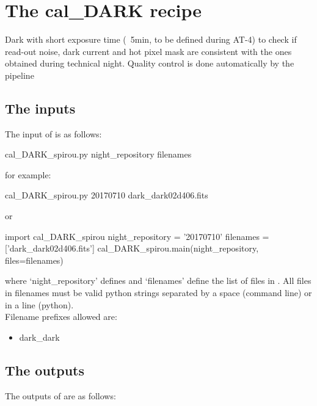 \section{The cal\_DARK recipe}
\label{ch:the_recipes:cal_DARK_spirou}

Dark with short exposure time (~5min, to be defined during AT-4) to check if read-out noise, dark current and hot pixel mask are consistent with the ones obtained during technical night. Quality control is done automatically by the pipeline \\


\subsection{The inputs}
The input of \calDARK is as follows:
\begin{cmdbox}
cal_DARK_spirou.py night_repository filenames
\end{cmdbox}
\noindent for example:
\begin{cmdbox}[title={example}]
cal_DARK_spirou.py 20170710 dark_dark02d406.fits
\end{cmdbox}
\noindent or
\begin{pythonbox}
import cal_DARK_spirou
night_repository = '20170710'
filenames = ['dark_dark02d406.fits']
cal_DARK_spirou.main(night_repository, files=filenames)
\end{pythonbox}

\noindent where `night\_repository' defines \argnightname and `filenames' define the list of files in \argfilenames. All files in filenames must be valid python strings separated by a space (command line) or in a line (python). \\

\noindent Filename prefixes allowed are:
\begin{itemize}
	\item dark\_dark
\end{itemize}

\subsection{The outputs}
The outputs of \calDARK are as follows:

